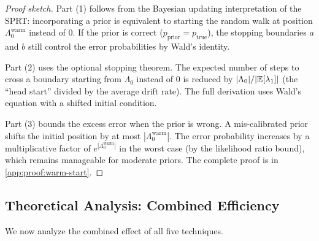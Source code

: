 \begin{proof}[Proof sketch]
Part (1) follows from the Bayesian updating interpretation of the
SPRT: incorporating a prior is equivalent to starting the random walk
at position $\Lambda_0^{\mathrm{warm}}$ instead of $0$. If the prior
is correct ($p_{\mathrm{prior}} = p_{\mathrm{true}}$), the stopping
boundaries $a$ and $b$ still control the error probabilities by
Wald's identity.

Part (2) uses the optional stopping theorem. The expected number of
steps to cross a boundary starting from $\Lambda_0$ instead of $0$ is
reduced by $|\Lambda_0| / |\mathbb{E}[\lambda_1]|$ (the ``head start''
divided by the average drift rate). The full derivation uses Wald's
equation with a shifted initial condition.

Part (3) bounds the excess error when the prior is wrong. A
mis-calibrated prior shifts the initial position by at most
$|\Lambda_0^{\mathrm{warm}}|$. The error probability increases by a
multiplicative factor of $e^{|\Lambda_0^{\mathrm{warm}}|}$ in the
worst case (by the likelihood ratio bound), which remains manageable
for moderate priors. The complete proof is in
\cref{app:proof:warm-start}. \qedhere
\end{proof}

\subsection{Theoretical Analysis: Combined Efficiency}
\label{sec:token:analysis}

We now analyze the combined effect of all five techniques.

